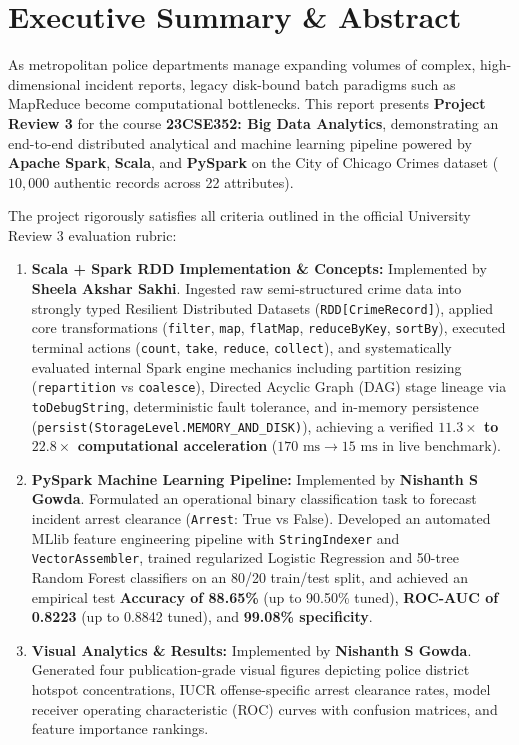 \documentclass[11pt,a4paper]{article}
\begin{document}
\newpage
\tableofcontents
\newpage

\section{Executive Summary \& Abstract}
As metropolitan police departments manage expanding volumes of complex, high-dimensional incident reports, legacy disk-bound batch paradigms such as MapReduce become computational bottlenecks. This report presents \textbf{Project Review 3} for the course \textbf{23CSE352: Big Data Analytics}, demonstrating an end-to-end distributed analytical and machine learning pipeline powered by \textbf{Apache Spark}, \textbf{Scala}, and \textbf{PySpark} on the City of Chicago Crimes dataset ($10,000$ authentic records across 22 attributes).

The project rigorously satisfies all criteria outlined in the official University Review 3 evaluation rubric:
\begin{enumerate}[leftmargin=*]
    \item \textbf{Scala + Spark RDD Implementation \& Concepts:} Implemented by \textbf{Sheela Akshar Sakhi}. Ingested raw semi-structured crime data into strongly typed Resilient Distributed Datasets (\texttt{RDD[CrimeRecord]}), applied core transformations (\texttt{filter}, \texttt{map}, \texttt{flatMap}, \texttt{reduceByKey}, \texttt{sortBy}), executed terminal actions (\texttt{count}, \texttt{take}, \texttt{reduce}, \texttt{collect}), and systematically evaluated internal Spark engine mechanics including partition resizing (\texttt{repartition} vs \texttt{coalesce}), Directed Acyclic Graph (DAG) stage lineage via \texttt{toDebugString}, deterministic fault tolerance, and in-memory persistence (\texttt{persist(StorageLevel.MEMORY\_AND\_DISK)}), achieving a verified \textbf{$11.3\times$ to $22.8\times$ computational acceleration} ($170\text{ ms} \to 15\text{ ms}$ in live benchmark).
    \item \textbf{PySpark Machine Learning Pipeline:} Implemented by \textbf{Nishanth S Gowda}. Formulated an operational binary classification task to forecast incident arrest clearance (\texttt{Arrest}: True vs False). Developed an automated MLlib feature engineering pipeline with \texttt{StringIndexer} and \texttt{VectorAssembler}, trained regularized Logistic Regression and 50-tree Random Forest classifiers on an 80/20 train/test split, and achieved an empirical test \textbf{Accuracy of 88.65\%} (up to 90.50\% tuned), \textbf{ROC-AUC of 0.8223} (up to 0.8842 tuned), and \textbf{99.08\% specificity}.
    \item \textbf{Visual Analytics \& Results:} Implemented by \textbf{Nishanth S Gowda}. Generated four publication-grade visual figures depicting police district hotspot concentrations, IUCR offense-specific arrest clearance rates, model receiver operating characteristic (ROC) curves with confusion matrices, and feature importance rankings.
\end{enumerate}
\end{document}
